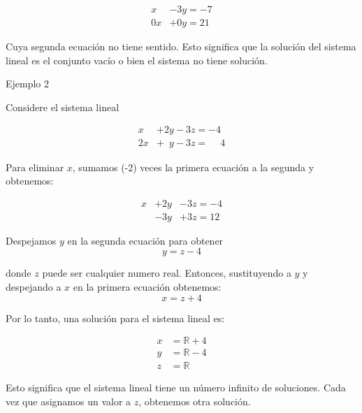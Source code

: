 \documentclass{article}
\begin{document}
\begin{equation*}
    \begin{aligned}
            x & - 3y = -7\\
            0x & +0y = 21
    \end{aligned}
\end{equation*}

Cuya segunda ecuación no tiene sentido. Esto significa que la solución del sistema lineal es el conjunto vacío o bien el sistema no tiene solución.

\begin{large}
    Ejemplo 2
\end{large}
Considere el sistema lineal

\begin{equation*}
    \begin{aligned}
            x & +2y -3z = -4\\
            2x & +\phantom{2}y -3z = \phantom{-} 4
    \end{aligned}
\end{equation*}

Para eliminar $x$, sumamos (-2) veces la primera ecuación a la segunda y obtenemos:

\begin{equation*}
    \begin{aligned}
            x & +2y &-3z = -4\\
            & -3y &+3z = 12
    \end{aligned}
\end{equation*}

Despejamos $y$ en la segunda ecuación para obtener $$y=z-4$$ 

donde $z$ puede ser cualquier numero real. Entonces, sustituyendo a $y$ y despejando a $x$ en la primera ecuación obtenemos: $$x = z + 4$$

Por lo tanto, una solución para el sistema lineal es: 

\begin{equation*}
    \begin{aligned}
            x & = \mathbb{R} + 4\\
            y & = \mathbb{R} - 4\\
            z &= \mathbb{R}
    \end{aligned}
\end{equation*}

Esto significa que el sistema lineal tiene un número infinito de soluciones. Cada vez que asignamos un valor a $z$, obtenemos otra solución.
\end{document}
